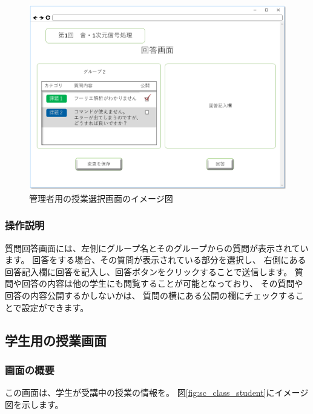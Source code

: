 \begin{figure}[htbp]
\begin{center}
  \includegraphics[width=1\linewidth,clip]{./img/sc_answer.png}
  \caption{管理者用の授業選択画面のイメージ図}\label{fig:sc_answer}
\end{center}
\end{figure}

\subsubsection{操作説明}
質問回答画面には、左側にグループ名とそのグループからの質問が表示されています。
回答をする場合、その質問が表示されている部分を選択し、
右側にある回答記入欄に回答を記入し、回答ボタンをクリックすることで送信します。
質問や回答の内容は他の学生にも閲覧することが可能となっており、
その質問や回答の内容公開するかしないかは、
質問の横にある公開の欄にチェックすることで設定ができます。

\subsection{学生用の授業画面}
\subsubsection{画面の概要}
この画面は、学生が受講中の授業の情報を。
図\ref{fig:sc_class_student}にイメージ図を示します。


